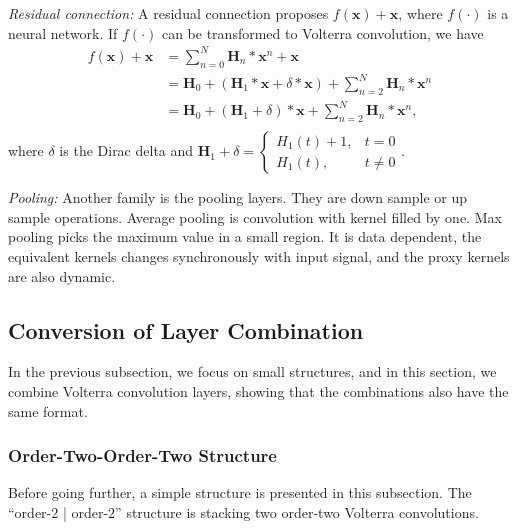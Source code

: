 \documentclass[twoside,11pt]{article}
\def\tvar#1{\mathbf{#1}} %
\begin{document}
\textit{Residual connection:} A residual connection \citep{He2016} proposes \(f(\tvar{x}) + \tvar{x}\), where \(f(\cdot)\) is a neural network.
If \(f(\cdot)\) can be transformed to Volterra convolution, we have
\begin{equation*}
  \begin{aligned}
    f(\tvar{x}) + \tvar{x}
     & = \sum_{n=0}^{N} \tvar{H}_n * \tvar{x}^n + \tvar{x}                                                 \\
     & = \tvar{H}_0 + (\tvar{H}_1 * \tvar{x} + \delta * \tvar{x}) + \sum_{n=2}^{N} \tvar{H}_n * \tvar{x}^n \\
     & = \tvar{H}_0 + (\tvar{H}_1 + \delta) * \tvar{x} + \sum_{n=2}^{N} \tvar{H}_n * \tvar{x}^n,           \\
  \end{aligned}
\end{equation*}
where \(\delta\) is the Dirac delta and
\(\tvar{H}_1 + \delta
= \left\{\begin{array}{ll}
  H_1(t) + 1, & t = 0   \\
  H_1(t),     & t \ne 0
\end{array} \right. \).

\textit{Pooling:} Another family is the pooling layers. They are down sample or up sample operations.
Average pooling is convolution with kernel filled by one.
Max pooling picks the maximum value in a small region. It is data dependent, the equivalent kernels changes synchronously with input signal, and the proxy kernels are also dynamic.

\subsection{Conversion of Layer Combination}
\label{subsec:conversion-of-layer-combination}

In the previous subsection, we focus on small structures, and in this section, we combine Volterra convolution layers, showing that the combinations also have the same format.

\subsubsection{Order-Two-Order-Two Structure}
\label{subsubsec:transform-o2-o2-vconv}

Before going further, a simple structure is presented in this subsection.
The ``order-\(2\) | order-\(2\)'' structure is stacking two order-two Volterra convolutions.
\end{document}
